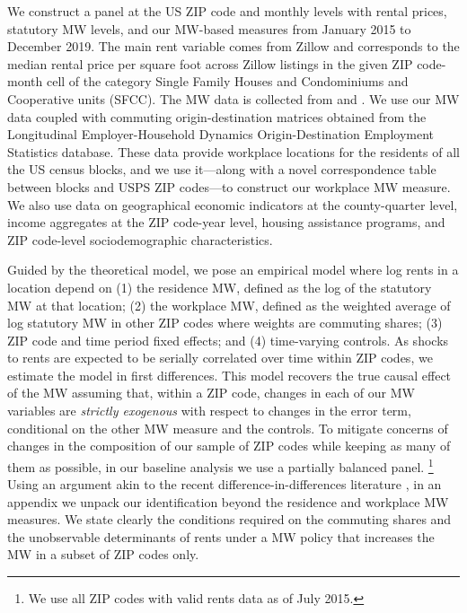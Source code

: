 We construct a panel at the US ZIP code and monthly levels with rental prices, 
statutory MW levels, and our MW-based measures from January 2015 to December 2019.
The main rent variable comes from Zillow and corresponds to the median 
rental price per square foot across Zillow listings in the given ZIP 
code-month cell of the category Single Family Houses and Condominiums and 
Cooperative units (SFCC).
The MW data is collected from \textcite{VaghulZipperer2016} and 
\textcite{BerkeleyLaborCenter}.
We use our MW data coupled with commuting origin-destination matrices obtained 
from the Longitudinal Employer-Household Dynamics Origin-Destination Employment 
Statistics \parencite[LODES;][]{CensusLODES} database.
These data provide workplace locations for the residents of all the US census 
blocks, and we use it---along with a novel correspondence table between blocks 
and USPS ZIP codes---to construct our workplace MW measure.
We also use data on 
geographical economic indicators at the county-quarter level, 
income aggregates at the ZIP code-year level,
housing assistance programs, and 
ZIP code-level sociodemographic characteristics.


Guided by the theoretical model, we pose an empirical model where log rents in 
a location depend on
(1) the residence MW, defined as the log of the statutory MW at that location;
(2) the workplace MW, defined as the weighted average of log statutory MW in other 
ZIP codes where weights are commuting shares;
(3) ZIP code and time period fixed effects;
and 
(4) time-varying controls.
As shocks to rents are expected to be serially correlated over time within ZIP 
codes, we estimate the model in first differences.
This model recovers the true causal effect of the MW assuming that, 
within a ZIP code, changes in each of our MW variables are 
\textit{strictly exogenous} with respect to changes in the error 
term, conditional on the other MW measure and the controls.
To mitigate concerns of changes in the composition of our sample of ZIP codes 
while keeping as many of them as possible, in our baseline analysis we use a 
partially balanced panel.%
\footnote{We use all ZIP codes with valid rents data as of July 2015.}
Using an argument akin to the recent difference-in-differences literature
\parencite[e.g.,][]{CallawayEtAl2021}, 
in an appendix we unpack our identification beyond the residence and
workplace MW measures.
We state clearly the conditions required on the commuting shares and the 
unobservable determinants of rents under a MW policy that increases the MW in 
a subset of ZIP codes only.

